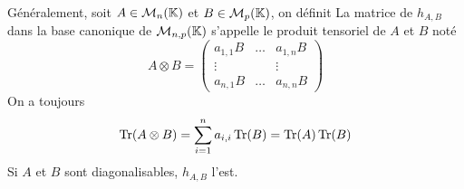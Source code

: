 \documentclass[12pt]{article}
\begin{document}
\begin{remark}
	Généralement, soit $A\in\mathcal{M}_{n}(\mathbb{K})$ et $B\in\mathcal{M}_{p}(\mathbb{K})$, on définit 
	La matrice de $h_{A,B}$ dans la base canonique de $\mathcal{M}_{n,p}(\mathbb{K})$ s'appelle le produit tensoriel de $A$ et $B$ noté 
	\begin{equation}
		A\otimes B=
		\begin{pmatrix}
			a_{1,1}B & \dots & a_{1,n}B\\
			\vdots & &\vdots\\
			a_{n,1}B&\dots & a_{n,n}B
		\end{pmatrix}
	\end{equation}
	On a toujours 
	\begin{equation}
		\operatorname{Tr}(A\otimes B)=\sum_{i=1}^{n}a_{i,i}\operatorname{Tr}(B)=\operatorname{Tr}(A)\operatorname{Tr}(B)
	\end{equation}
	Si $A$ et $B$ sont diagonalisables, $h_{A,B}$ l'est.
\end{remark}
\end{document}
